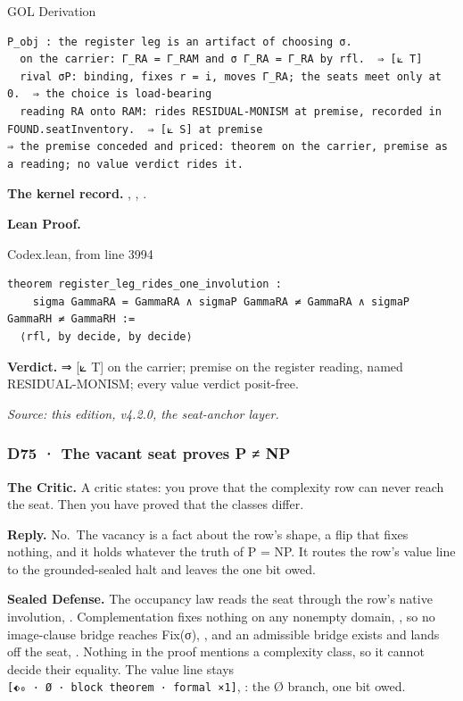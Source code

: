 \documentclass[10pt,twocolumn]{article}
\begin{document}
\begin{golbox}{GOL Derivation}
\begin{lstlisting}[style=golv]
P_obj : the register leg is an artifact of choosing σ.
  on the carrier: Γ_RA = Γ_RAM and σ Γ_RA = Γ_RA by rfl.  ⇒ [⟀ T]
  rival σP: binding, fixes r = i, moves Γ_RA; the seats meet only at 0.  ⇒ the choice is load-bearing
  reading RA onto RAM: rides RESIDUAL-MONISM at premise, recorded in FOUND.seatInventory.  ⇒ [⟀ S] at premise
⇒ the premise conceded and priced: theorem on the carrier, premise as a reading; no value verdict rides it.
\end{lstlisting}
\end{golbox}

\textbf{The kernel record.}
\texttt{},
\texttt{},
\texttt{}.

\textbf{Lean Proof.}

\begin{leanexcerpt}{Codex.lean, from line 3994}
\begin{lstlisting}[style=leanx,firstnumber=3994]
theorem register_leg_rides_one_involution :
    sigma GammaRA = GammaRA ∧ sigmaP GammaRA ≠ GammaRA ∧ sigmaP GammaRH ≠ GammaRH :=
  ⟨rfl, by decide, by decide⟩
\end{lstlisting}
\end{leanexcerpt}

\textbf{Verdict.} ⇒ {[}⟀ T{]} on the carrier; premise on the register
reading, named RESIDUAL-MONISM; every value verdict posit-free.

\emph{Source: this edition, v4.2.0, the seat-anchor layer.}

\hypertarget{d75-the-vacant-seat-proves-p-np}{%
\subsubsection{D75 · The vacant seat proves P ≠
NP}\label{d75-the-vacant-seat-proves-p-np}}

\textbf{The Critic.} A critic states: you prove that the complexity row
can never reach the seat. Then you have proved that the classes differ.

\textbf{Reply.} No.~The vacancy is a fact about the row's shape, a flip
that fixes nothing, and it holds whatever the truth of P = NP. It routes
the row's value line to the grounded-sealed halt and leaves the one bit
owed.

\textbf{Sealed Defense.} The occupancy law reads the seat through the
row's native involution,
\texttt{}. Complementation
fixes nothing on any nonempty domain,
\texttt{}, so no image-clause bridge
reaches Fix(σ), \texttt{}, and an
admissible bridge exists and lands off the seat,
\texttt{}. Nothing in the proof
mentions a complexity class, so it cannot decide their equality. The
value line stays
\texttt{{[}⬖₀\ ·\ Ø\ ·\ block\ theorem\ ·\ formal\ ×1{]}},
\texttt{}: the Ø branch, one bit owed.
\end{document}
